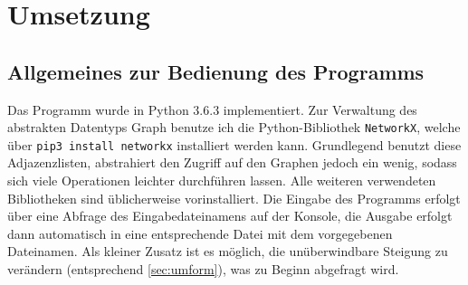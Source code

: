 \documentclass[a4paper, notitlepage, 12pt]{scrartcl}
\begin{document}
 \section{Umsetzung}
 \subsection{Allgemeines zur Bedienung des Programms}
 Das Programm wurde in Python 3.6.3 implementiert. Zur Verwaltung des abstrakten Datentyps Graph benutze ich die Python-Bibliothek \texttt{NetworkX}, welche über \texttt{pip3 install networkx} installiert werden kann. Grundlegend benutzt diese Adjazenzlisten, abstrahiert den Zugriff auf den Graphen jedoch ein wenig, sodass sich viele Operationen leichter durchführen lassen. Alle weiteren verwendeten Bibliotheken sind üblicherweise vorinstalliert. Die Eingabe des Programms erfolgt über eine Abfrage des Eingabedateinamens auf der Konsole, die Ausgabe erfolgt dann automatisch in eine entsprechende Datei mit dem vorgegebenen Dateinamen. Als kleiner Zusatz ist es möglich, die unüberwindbare Steigung zu verändern (entsprechend \autoref{sec:umform}), was zu Beginn abgefragt wird.
\end{document}

